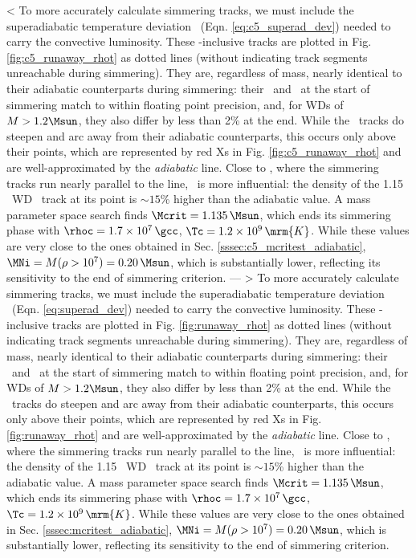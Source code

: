 < To more accurately calculate simmering tracks, we must include the superadiabatic temperature deviation \dnabconv\ (Eqn. \ref{eq:c5_superad_dev}) needed to carry the convective luminosity.  These \dnabconv-inclusive tracks are plotted in Fig. \ref{fig:c5_runaway_rhot} as dotted lines (without indicating track segments unreachable during simmering).  They are, regardless of mass, nearly identical to their adiabatic counterparts during simmering: their \rhoc\ and \Tc\ at the start of simmering match to within floating point precision, and, for WDs of $M > 1.2\Msun$, they also differ by less than 2\% at the end.  While the \dnabconv\ tracks do steepen and arc away from their adiabatic counterparts, this occurs only above their \citeal{wooswk04} points, which are represented by red Xs in Fig. \ref{fig:c5_runaway_rhot} and are well-approximated by the \textit{adiabatic} \citeal{wooswk04} line.  Close to \Mcrit, where the simmering tracks run nearly parallel to the \citeal{wooswk04} line, \dnabconv\ is more influential: the density of the 1.15 \Msun\ WD \dnabconv\ track at its \citeal{wooswk04} point is $\sim15$\% higher than the adiabatic value.  A mass parameter space search finds $\Mcrit=1.135\,\Msun$, which ends its simmering phase with $\rhoc = 1.7\times10^7\,\gcc$, $\Tc = 1.2\times10^9\,\mrm{K}$.  While these values are very close to the ones obtained in Sec. \ref{sssec:c5_mcritest_adiabatic}, $\MNi = M(\rho>10^7) = 0.20\,\Msun$, which is substantially lower, reflecting its sensitivity to the end of simmering criterion.
---
> To more accurately calculate simmering tracks, we must include the superadiabatic temperature deviation \dnabconv\ (Eqn. \ref{eq:superad_dev}) needed to carry the convective luminosity.  These \dnabconv-inclusive tracks are plotted in Fig. \ref{fig:runaway_rhot} as dotted lines (without indicating track segments unreachable during simmering).  They are, regardless of mass, nearly identical to their adiabatic counterparts during simmering: their \rhoc\ and \Tc\ at the start of simmering match to within floating point precision, and, for WDs of $M > 1.2\Msun$, they also differ by less than 2\% at the end.  While the \dnabconv\ tracks do steepen and arc away from their adiabatic counterparts, this occurs only above their \citeal{wooswk04} points, which are represented by red Xs in Fig. \ref{fig:runaway_rhot} and are well-approximated by the \textit{adiabatic} \citeal{wooswk04} line.  Close to \Mcrit, where the simmering tracks run nearly parallel to the \citeal{wooswk04} line, \dnabconv\ is more influential: the density of the 1.15 \Msun\ WD \dnabconv\ track at its \citeal{wooswk04} point is $\sim15$\% higher than the adiabatic value.  A mass parameter space search finds $\Mcrit=1.135\,\Msun$, which ends its simmering phase with $\rhoc = 1.7\times10^7\,\gcc$, $\Tc = 1.2\times10^9\,\mrm{K}$.  While these values are very close to the ones obtained in Sec. \ref{sssec:mcritest_adiabatic}, $\MNi = M(\rho>10^7) = 0.20\,\Msun$, which is substantially lower, reflecting its sensitivity to the end of simmering criterion.
